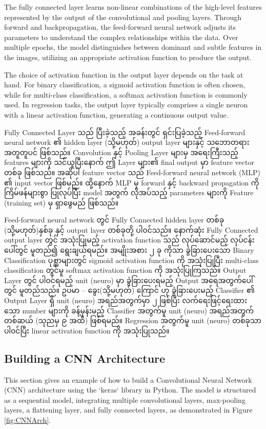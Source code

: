 The fully connected layer learns non-linear combinations of the high-level features represented by the output of the convolutional and pooling layers. Through forward and backpropagation, the feed-forward neural network adjusts its parameters to understand the complex relationships within the data. Over multiple epochs, the model distinguishes between dominant and subtle features in the images, utilizing an appropriate activation function to produce the output.

The choice of activation function in the output layer depends on the task at hand. For binary classification, a sigmoid activation function is often chosen, while for multi-class classification, a softmax activation function is commonly used. In regression tasks, the output layer typically comprises a single neuron with a linear activation function, generating a continuous output value.

Fully Connected Layer သည် ပြီးခဲ့သည့် အခန်းတွင် ရှင်းပြခဲ့သည့် Feed-forward neural network ၏ hidden layer (သို့မဟုတ်) output layer များနှင့် သဘောတရားအတူတူပင် ဖြစ်သည်။ Convolution နှင့် Pooling Layer များမှ အရေးကြီးသည့် features များကို သင်ယူပြီးနောက် ဤ Layer များ၏ final output မှာ feature vector တစ်ခု ဖြစ်သည်။  အဆိုပါ feature vector သည်  Feed-forward neural network (MLP) ၏ input vector ဖြစ်မည်။ ထို့နောက် MLP မှ forward နှင့် backward propagation ကို ကြိမ်ဖန်များစွာ ပြုလုပ်ပြီး model အတွက် လိုအပ်သည့် parameters များကို Feature (training set) မှ ရှာဖွေမည် ဖြစ်သည်။ 

Feed-forward neural network တွင် Fully Connected hidden layer တစ်ခု (သို့မဟုတ်)နှစ်ခု နှင့် output layer တစ်ခုတို့ ပါ၀င်သည်။ နောက်ဆုံး Fully Connected output layer တွင် အသုံးပြုမည့် activation function သည် လုပ်ဆောင်မည့် လုပ်ငန်းပေါ်တွင် မူတည်၍ ရွေးချယ်ရမည်။ အမျိုးအစား ၂ ခု ကိုသာ ခွဲခြားပေးသော Binary Classification ပုစ္ဆာများတွင် sigmoid activation function ကို အသုံးပြုပြီး multi-class classification တွင်မူ softmax activation function ကို အသုံးပြုကြသည်။ Output Layer တွင် ပါ၀င်ရမည့် unit (neuro) မှာ ခွဲခြားပေးရမည့် Output အရေအတွက်ပေါ်တွင် မူတည်သည်။ ဥပမာ -- ခွေး(သို့မဟုတ်) ကြောင် ဟု ခွဲခြားပေးမည့် Classifier ၏ Output Layer ရှိ unit (neuro) အရည်အတွက်မှာ ၂ ဖြစ်ပြီး လက်ရေးဖြင့်ရေးထားသော number များကို ခန့်မှန်းမည့် Classifier အတွက်မူ unit (neuro) အရည်အတွက် တစ်ဆယ် (သုညမှ ၉ အထိ) ဖြစ်ရမည်။ Regression အတွက်မူ unit (neuro) တစ်ခုသာ ပါ၀င်ပြီး linear activation function ကို အသုံးပြုသည်။ 

\setcounter{stepcounter}{0}
\subsection{Building a CNN Architecture}
This section gives an example of how to build a Convolutional Neural Network (CNN) architecture using the `keras` library in Python. The model is structured as a sequential model, integrating multiple convolutional layers, max-pooling layers, a flattening layer, and fully connected layers, as demonstrated in Figure \ref{fig:CNNArch}.

